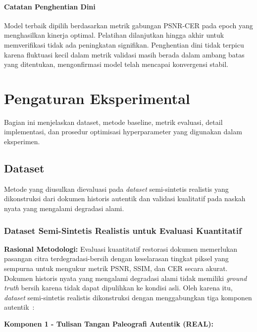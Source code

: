 \documentclass[journal]{IEEEtran}
\begin{document}
\paragraph{Catatan Penghentian Dini} Model terbaik dipilih berdasarkan metrik gabungan PSNR-CER pada epoch yang menghasilkan kinerja optimal. Pelatihan dilanjutkan hingga akhir untuk memverifikasi tidak ada peningkatan signifikan. Penghentian dini tidak terpicu karena fluktuasi kecil dalam metrik validasi masih berada dalam ambang batas yang ditentukan, mengonfirmasi model telah mencapai konvergensi stabil.

\section{Pengaturan Eksperimental}

Bagian ini menjelaskan dataset, metode baseline, metrik evaluasi, detail implementasi, dan prosedur optimisasi hyperparameter yang digunakan dalam eksperimen.

\subsection{Dataset}

Metode yang diusulkan dievaluasi pada \textit{dataset} semi-sintetis realistis yang dikonstruksi dari dokumen historis autentik dan validasi kualitatif pada naskah nyata yang mengalami degradasi alami.

\subsubsection{Dataset Semi-Sintetis Realistis untuk Evaluasi Kuantitatif}

\textbf{Rasional Metodologi:} Evaluasi kuantitatif restorasi dokumen memerlukan pasangan citra terdegradasi-bersih dengan keselarasan tingkat piksel yang sempurna untuk mengukur metrik PSNR, SSIM, dan CER secara akurat. Dokumen historis nyata yang mengalami degradasi alami tidak memiliki \textit{ground truth} bersih karena tidak dapat dipulihkan ke kondisi asli. Oleh karena itu, \textit{dataset} semi-sintetis realistis dikonstruksi dengan menggabungkan tiga komponen autentik~\cite{souibgui2021enhance,zhao2019document}:

\textbf{Komponen 1 - Tulisan Tangan Paleografi Autentik (REAL):}
\end{document}
